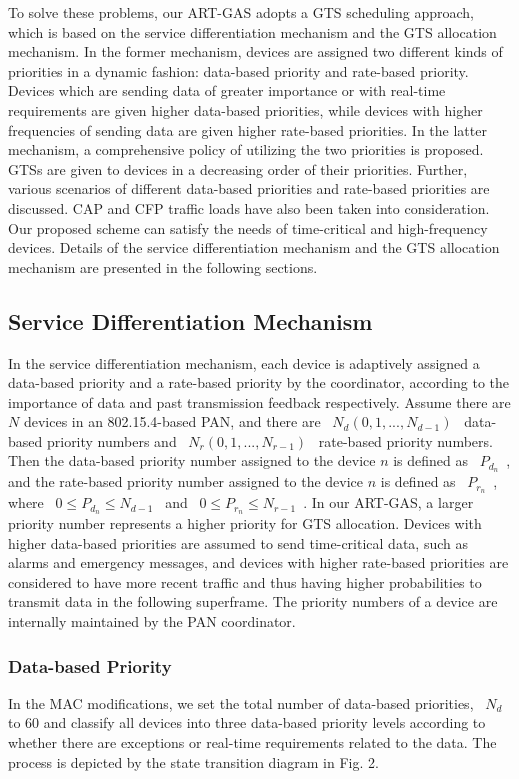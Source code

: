 \documentclass[letterpaper]{sig-alternate-10pt}
\begin{document}
To solve these problems, our ART-GAS adopts a GTS scheduling approach, which is based on the service differentiation mechanism and the GTS allocation mechanism. In the former mechanism, devices are assigned two different kinds of priorities in a dynamic fashion: data-based priority and rate-based priority. Devices which are sending data of greater importance or with real-time requirements are given higher data-based priorities, while devices with higher frequencies of sending data are given higher rate-based priorities. In the latter mechanism, a comprehensive policy of utilizing the two priorities is proposed. GTSs are given to devices in a decreasing order of their priorities. Further, various scenarios of different data-based priorities and rate-based priorities are discussed. CAP and CFP traffic loads have also been taken into consideration. Our proposed scheme can satisfy the needs of time-critical and high-frequency devices. Details of the service differentiation mechanism and the GTS allocation mechanism are presented in the following sections.

\subsection{Service Differentiation Mechanism}
In the service differentiation mechanism, each device is adaptively assigned a data-based priority and a rate-based priority by the coordinator, according to the importance of data and past transmission feedback respectively. Assume there are $N$ devices in an 802.15.4-based PAN, and there are ~$N_d (0, 1, ..., N_{d-1})$~ data-based priority numbers and ~$N_r (0, 1, ..., N_{r-1})$~ rate-based priority numbers. Then the data-based priority number assigned to the device $n$ is defined as ~$P_{d_n}$~, and the rate-based priority number assigned to the device $n$ is defined as ~$P_{r_n}$~, where ~$0 \le P_{d_n} \le N_{d-1}$~ and ~$0 \le P_{r_n} \le N_{r-1}$~. In our ART-GAS, a larger priority number represents a higher priority for GTS allocation. Devices with higher data-based priorities are assumed to send time-critical data, such as alarms and emergency messages, and devices with higher rate-based priorities are considered to have more recent traffic and thus having higher probabilities to transmit data in the following superframe. The priority numbers of a device are internally maintained by the PAN coordinator.

\subsubsection{Data-based Priority}
In the MAC modifications, we set the total number of data-based priorities, ~$N_d$~ to 60 and classify all devices into three data-based priority levels according to whether there are exceptions or real-time requirements related to the data. The process is depicted by the state transition diagram in Fig. 2.
\end{document}
